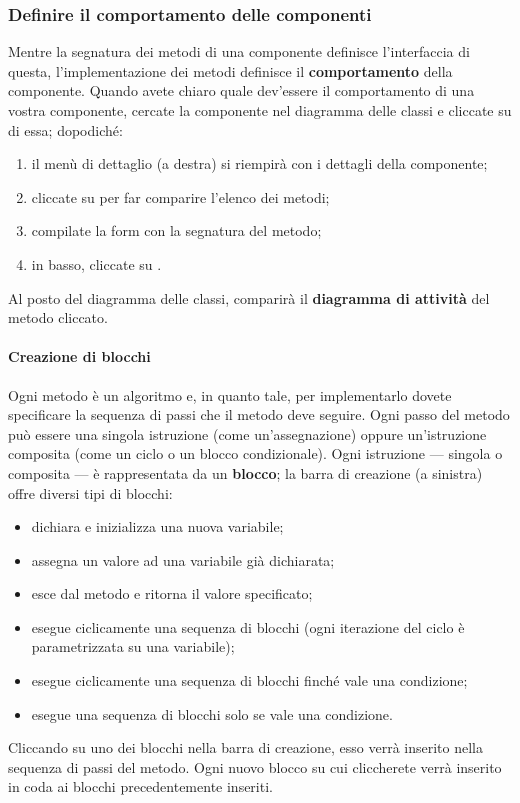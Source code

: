 \subsubsection{Definire il comportamento delle componenti} \label{sec:activity}
Mentre la segnatura dei metodi di una componente definisce l'interfaccia di questa, l'implementazione dei metodi definisce il \textbf{comportamento} della componente. Quando avete chiaro quale dev'essere il comportamento di una vostra componente, cercate la componente nel diagramma delle classi e cliccate su di essa; dopodiché:
\begin{enumerate}
	\item il menù di dettaglio (a destra) si riempirà con i dettagli della componente;
	\item cliccate su  per far comparire l'elenco dei metodi;
	\item compilate la form con la segnatura del metodo;
	\item in basso, cliccate su .
\end{enumerate}
Al posto del diagramma delle classi, comparirà il \textbf{diagramma di attività} del metodo cliccato.

\paragraph{Creazione di blocchi} Ogni metodo è un algoritmo e, in quanto tale, per implementarlo dovete specificare la sequenza di passi che il metodo deve seguire. Ogni passo del metodo può essere una singola istruzione (come un'assegnazione) oppure un'istruzione composita (come un ciclo o un blocco condizionale). Ogni istruzione --- singola o composita --- è rappresentata da un \textbf{blocco}; la barra di creazione (a sinistra) offre diversi tipi di blocchi:
\begin{itemize}
	\item {} dichiara e inizializza una nuova variabile;
	\item {} assegna un valore ad una variabile già dichiarata;
	\item {} esce dal metodo e ritorna il valore specificato;
	\item {} esegue ciclicamente una sequenza di blocchi (ogni iterazione del ciclo è parametrizzata su una variabile);
	\item {} esegue ciclicamente una sequenza di blocchi finché vale una condizione;
	\item {} esegue una sequenza di blocchi solo se vale una condizione.
\end{itemize}
Cliccando su uno dei blocchi nella barra di creazione, esso verrà inserito nella sequenza di passi del metodo. Ogni nuovo blocco su cui cliccherete  verrà inserito in coda ai blocchi precedentemente inseriti.

